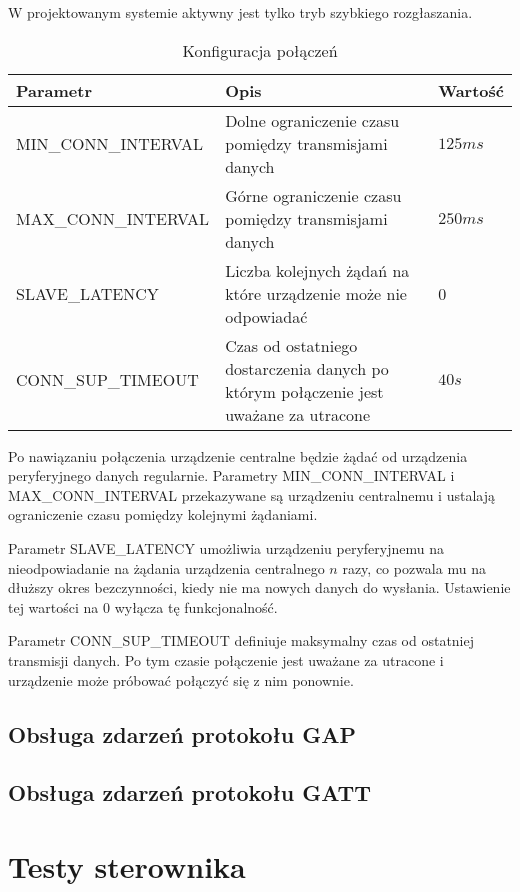 W projektowanym systemie aktywny jest tylko tryb szybkiego rozgłaszania.

\begin{table}[t]

\begin{tabularx}{\linewidth}{|l|X|l|}

\hline Parametr & Opis & Wartość \\

\hline MIN\_CONN\_INTERVAL & Dolne ograniczenie czasu pomiędzy transmisjami
danych & $125ms$ \\

\hline MAX\_CONN\_INTERVAL & Górne ograniczenie czasu pomiędzy transmisjami
danych & $250ms$ \\

\hline SLAVE\_LATENCY & Liczba kolejnych żądań na które urządzenie może nie
odpowiadać & 0 \\

\hline CONN\_SUP\_TIMEOUT & Czas od ostatniego dostarczenia danych po którym
połączenie jest uważane za utracone & $40s$ \\

\hline \end{tabularx}

\caption{Konfiguracja połączeń}

\label{tab:parametry-polaczenia}

\end{table}

Po nawiązaniu połączenia urządzenie centralne będzie żądać od urządzenia
peryferyjnego danych regularnie. Parametry MIN\_CONN\_INTERVAL
i MAX\_CONN\_INTERVAL przekazywane są urządzeniu centralnemu i ustalają
ograniczenie czasu pomiędzy kolejnymi żądaniami.

Parametr SLAVE\_LATENCY umożliwia urządzeniu peryferyjnemu na nieodpowiadanie na
żądania urządzenia centralnego $n$ razy, co pozwala mu na dłuższy okres
bezczynności, kiedy nie ma nowych danych do wysłania. Ustawienie tej wartości na
0 wyłącza tę funkcjonalność.

Parametr CONN\_SUP\_TIMEOUT definiuje maksymalny czas od ostatniej transmisji
danych. Po tym czasie połączenie jest uważane za utracone i urządzenie może
próbować połączyć się z nim ponownie.

\subsection{Obsługa zdarzeń protokołu GAP}

\subsection{Obsługa zdarzeń protokołu GATT}

\section{Testy sterownika}
